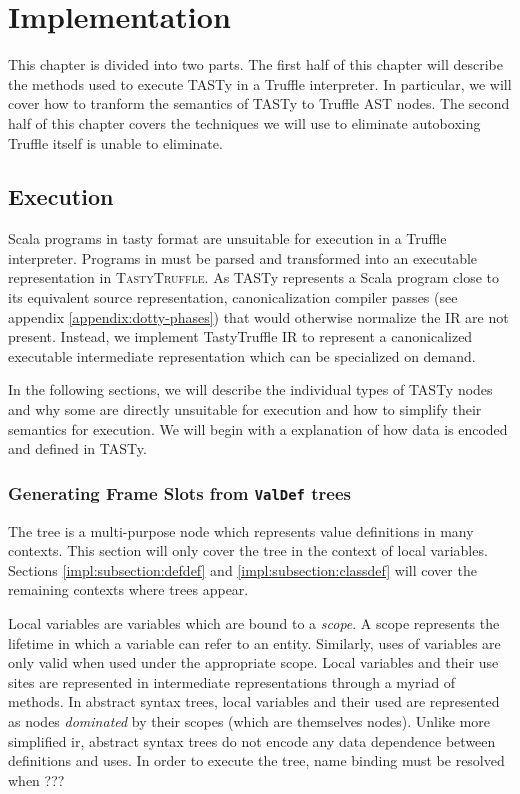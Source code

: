 \chapter{Implementation}
\label{chapter:implementation}

This chapter is divided into two parts.
The first half of this chapter will describe the methods used to execute TASTy in a Truffle interpreter.
In particular, we will cover how to tranform the semantics of TASTy to Truffle AST nodes.
The second half of this chapter covers the techniques we will use to eliminate autoboxing Truffle itself is unable to eliminate. 

\section{Execution}

Scala programs in \acrshort{tasty} format are unsuitable for execution in a Truffle interpreter. 
Programs in must be parsed and transformed into an executable representation in \textsc{TastyTruffle}. 
As TASTy represents a Scala program close to its equivalent source representation, canonicalization compiler passes (see appendix \ref{appendix:dotty-phases}) that would otherwise normalize the IR are not present. 
Instead, we implement TastyTruffle IR to represent a canonicalized executable intermediate representation which can be specialized on demand. 

In the following sections, we will describe the individual types of TASTy nodes and why some are directly unsuitable for execution and how to simplify their semantics for execution.
We will begin with a explanation of how data is encoded and defined in TASTy.


\subsection{Generating Frame Slots from \texttt{ValDef} trees} 

The  tree is a multi-purpose node which represents value definitions in many contexts.
This section will only cover the  tree in the context of local variables.
Sections \ref{impl:subsection:defdef} and \ref{impl:subsection:classdef} will cover the remaining contexts where  trees appear.

Local variables are variables which are bound to a \textit{scope}. 
A scope represents the lifetime in which a variable can refer to an entity. 
Similarly, uses of variables are only valid when used under the appropriate scope. 
Local variables and their use sites are represented in intermediate representations through a myriad of methods. 
In abstract syntax trees, local variables and their used are represented as nodes \textit{dominated} by their scopes (which are themselves nodes). 
Unlike more simplified \acrshort{ir}, abstract syntax trees do not encode any data dependence between definitions and uses\cite{ssa}. 
In order to execute the tree, name binding must be resolved when ???

